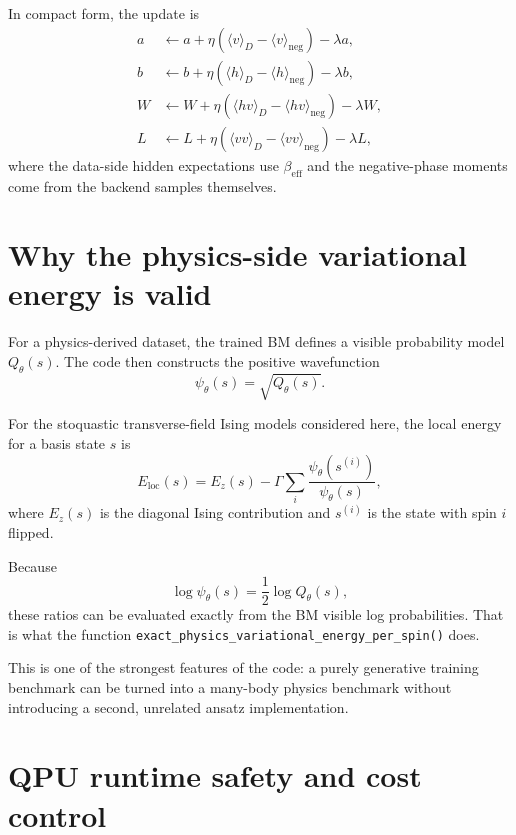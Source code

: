 \documentclass[11pt]{article}
\begin{document}
In compact form, the update is
\begin{align}
a &\leftarrow a + \eta(\langle v\rangle_D - \langle v\rangle_{\mathrm{neg}})-\lambda a,\\
b &\leftarrow b + \eta(\langle h\rangle_D - \langle h\rangle_{\mathrm{neg}})-\lambda b,\\
W &\leftarrow W + \eta(\langle hv\rangle_D - \langle hv\rangle_{\mathrm{neg}})-\lambda W,\\
L &\leftarrow L + \eta(\langle vv\rangle_D - \langle vv\rangle_{\mathrm{neg}})-\lambda L,
\end{align}
where the data-side hidden expectations use $\beta_{\mathrm{eff}}$ and the
negative-phase moments come from the backend samples themselves.

\section{Why the physics-side variational energy is valid}

For a physics-derived dataset, the trained BM defines a visible probability
model $Q_\theta(s)$. The code then constructs the positive wavefunction
\begin{equation}
\psi_\theta(s)=\sqrt{Q_\theta(s)}.
\end{equation}

For the stoquastic transverse-field Ising models considered here, the local
energy for a basis state $s$ is
\begin{equation}
E_{\mathrm{loc}}(s)=E_z(s)-\Gamma\sum_i
\frac{\psi_\theta(s^{(i)})}{\psi_\theta(s)},
\end{equation}
where $E_z(s)$ is the diagonal Ising contribution and $s^{(i)}$ is the state with
spin $i$ flipped.

Because
\begin{equation}
\log \psi_\theta(s)=\frac12\log Q_\theta(s),
\end{equation}
these ratios can be evaluated exactly from the BM visible log probabilities.
That is what the function
\texttt{exact\_physics\_variational\_energy\_per\_spin()} does.

This is one of the strongest features of the code: a purely generative training
benchmark can be turned into a many-body physics benchmark without introducing a
second, unrelated ansatz implementation.

\section{QPU runtime safety and cost control}
\end{document}
